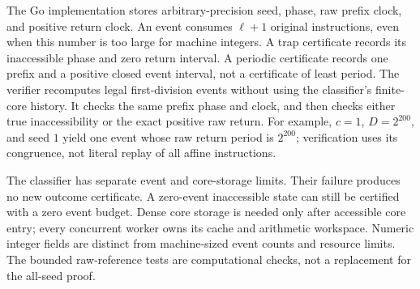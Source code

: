 \documentclass[11pt,letterpaper]{article}
\begin{document}
The Go implementation stores arbitrary-precision seed, phase, raw prefix
clock, and positive return clock. An event consumes $\ell+1$ original
instructions, even when this number is too large for machine integers.
A trap certificate records its inaccessible phase and zero return interval.
A periodic certificate records one prefix and a positive closed event
interval, not a certificate of least period.
The verifier recomputes legal first-division events without using the
classifier's finite-core history. It checks the same prefix phase and clock,
and then checks either true inaccessibility or the exact positive raw return.
For example, $c=1$, $D=2^{200}$, and seed $1$ yield one event whose raw return
period is $2^{200}$; verification uses its congruence, not literal replay of
all affine instructions.

The classifier has separate event and core-storage limits. Their failure
produces no new outcome certificate. A zero-event inaccessible state can
still be certified with a zero event budget. Dense core storage is needed
only after accessible core entry; every concurrent worker owns its cache
and arithmetic workspace. Numeric integer fields are distinct from
machine-sized event counts and resource limits. The bounded raw-reference
tests are computational checks, not a replacement for the all-seed proof.



\end{document}
